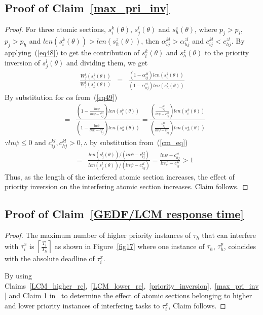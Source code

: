 \documentclass[conference]{sig-alternate}
\begin{document}
\subsection{\label{proof_max_pri_inv} Proof of Claim~\ref{max_pri_inv}}
\begin{proof}
For three atomic sections, $s_i^k(\theta)$, $s_j^l(\theta)$ and $s_h^z(\theta)$, where $p_j>p_i$, $p_j>p_h$ and $len(s_i^k(\theta))>len(s_h^z(\theta))$, then $\alpha_{ij}^{kl}>\alpha_{hj}^{zl}$ and $c_{ij}^{kl}<c_{hj}^{zl}$. By applying~(\ref{eq48}) to get the contribution of $s_i^k(\theta)$ and $s_h^z(\theta)$ to the priority inversion of $s_j^l(\theta)$ and dividing them, we get
\begin{eqnarray*}
\frac{W_{j}^{l}(s_{i}^{k}(\theta))}{W_{j}^{l}(s_{h}^{z}(\theta))} & = & \frac{\left(1-\alpha_{ij}^{kl}\right)len(s_{i}^{k}(\theta))}{\left(1-\alpha_{hj}^{zl}\right)len(s_{h}^{z}(\theta))}
\end{eqnarray*}
By substitution for $\alpha$s from~(\ref{eq49})
\begin{eqnarray*}
 & = & \frac{(1-\frac{ln\psi}{ln\psi-c_{ij}^{kl}})len(s_{i}^{k}(\theta))}{(1-\frac{ln\psi}{ln\psi-c_{hj}^{zl}})len(s_{h}^{z}(\theta))}
  =  \frac{(\frac{-c_{ij}^{kl}}{ln\psi-c_{ij}^{kl}})len(s_{i}^{k}(\theta))}{(\frac{-c_{hj}^{zl}}{ln\psi-c_{hj}^{zl}})len(s_{h}^{z}(\theta))}\end{eqnarray*}
$\because ln\psi \le 0$ and $c_{ij}^{kl},c_{hj}^{kl} > 0, \therefore$ by substitution from~(\ref{cm_eq})
\begin{eqnarray*}
 & = & \frac{len(s_{j}^{l}(\theta))/(ln\psi-c_{ij}^{kl})}{len(s_{j}^{l}(\theta))/(ln\psi-c_{hj}^{zl})}
  =  \frac{ln\psi-c_{hj}^{zl}}{ln\psi-c_{ij}^{kl}}>1\end{eqnarray*}
Thus, as the length of the interfered atomic section increases, the effect of priority inversion on the interfering atomic section increases. Claim follows.
\end{proof}
\subsection{\label{proof_GEDF/LCM response time}Proof of Claim~\ref{GEDF/LCM response time}}
\begin{proof}
The maximum number of higher priority instances of $\tau_h$ that can interfere with $\tau_i^x$ is $\left\lceil\frac{T_i}{T_h}\right\rceil$ as shown in Figure~\ref{fig17} where one instance of $\tau_h$, $\tau_h^p$, coincides with the absolute deadline of $\tau_i^x$.

By using Claims~\ref{LCM_higher_rc},~\ref{LCM_lower_rc},~\ref{priority_inversion},~\ref{max_pri_inv} and Claim 1 in~\cite{stmconcurrencycontrol:emsoft11} to determine the effect of atomic sections belonging to higher and lower priority instances of interfering tasks to $\tau_i^x$, Claim follows.
\end{proof}
\end{document}
